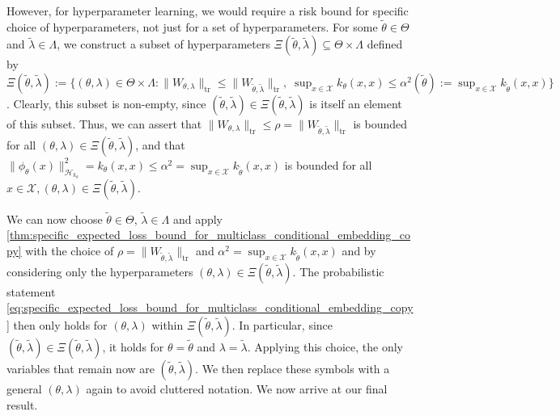 \documentclass[twoside]{article}
\begin{document}
		However, for hyperparameter learning, we would require a risk bound for specific choice of hyperparameters, not just for a set of hyperparameters. For some $\tilde{\theta} \in \Theta$ and $\tilde{\lambda} \in \Lambda$, we construct a subset of hyperparameters $\Xi(\tilde{\theta}, \tilde{\lambda}) \subseteq \Theta \times \Lambda$ defined by $\Xi(\tilde{\theta}, \tilde{\lambda}) := \{ (\theta, \lambda) \in \Theta \times \Lambda : \| W_{\theta, \lambda} \|_{\mathrm{tr}} \leq \| W_{\tilde{\theta}, \tilde{\lambda}} \|_{\mathrm{tr}}, \; \sup_{x \in \mathcal{X}} k_{\theta}(x, x) \leq \alpha^{2}(\tilde{\theta}) := \sup_{x \in \mathcal{X}} k_{\tilde{\theta}}(x, x) \}$. Clearly, this subset is non-empty, since $(\tilde{\theta}, \tilde{\lambda}) \in \Xi(\tilde{\theta}, \tilde{\lambda})$ is itself an element of this subset. Thus, we can assert that $\| W_{\theta, \lambda} \|_{\mathrm{tr}} \leq \rho = \| W_{\tilde{\theta}, \tilde{\lambda}} \|_{\mathrm{tr}}$ is bounded for all $(\theta, \lambda) \in \Xi(\tilde{\theta}, \tilde{\lambda})$, and that $\| \phi_{\theta}(x) \|_{\mathcal{H}_{k_{\theta}}}^{2} = k_{\theta}(x, x) \leq \alpha^{2} = \sup_{x \in \mathcal{X}} k_{\tilde{\theta}}(x, x)$ is bounded for all $x \in \mathcal{X}, (\theta, \lambda) \in \Xi(\tilde{\theta}, \tilde{\lambda})$.
		
		We can now choose $\tilde{\theta} \in \Theta$, $\tilde{\lambda} \in \Lambda$ and apply \cref{thm:specific_expected_loss_bound_for_multiclass_conditional_embedding_copy} with the choice of $\rho = \| W_{\tilde{\theta}, \tilde{\lambda}} \|_{\mathrm{tr}}$ and $\alpha^{2} = \sup_{x \in \mathcal{X}} k_{\tilde{\theta}}(x, x)$ and by considering only the hyperparameters $(\theta, \lambda) \in \Xi(\tilde{\theta}, \tilde{\lambda})$. The probabilistic statement \eqref{eq:specific_expected_loss_bound_for_multiclass_conditional_embedding_copy} then only holds for $(\theta, \lambda)$ within $\Xi(\tilde{\theta}, \tilde{\lambda})$. In particular, since $(\tilde{\theta}, \tilde{\lambda}) \in \Xi(\tilde{\theta}, \tilde{\lambda})$, it holds for $\theta = \tilde{\theta}$ and $\lambda = \tilde{\lambda}$. Applying this choice, the only variables that remain now are $(\tilde{\theta}, \tilde{\lambda})$. We then replace these symbols with a general $(\theta, \lambda)$ again to avoid cluttered notation. We now arrive at our final result.
	
\end{document}
